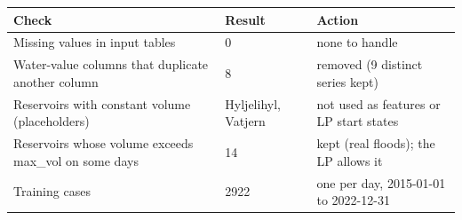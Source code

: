 \begin{tabular}{p{4.2cm}p{3cm}p{4.6cm}}
\toprule
\textbf{Check} & \textbf{Result} & \textbf{Action} \\
\midrule
Missing values in input tables & 0 & none to handle \\
Water-value columns that duplicate another column & 8 & removed (9 distinct series kept) \\
Reservoirs with constant volume (placeholders) & Hyljelihyl, Vatjern & not used as features or LP start states \\
Reservoirs whose volume exceeds max\_\allowbreak{}vol on some days & 14 & kept (real floods); the LP allows it \\
Training cases & 2922 & one per day, 2015-01-01 to 2022-12-31 \\
\bottomrule
\end{tabular}
